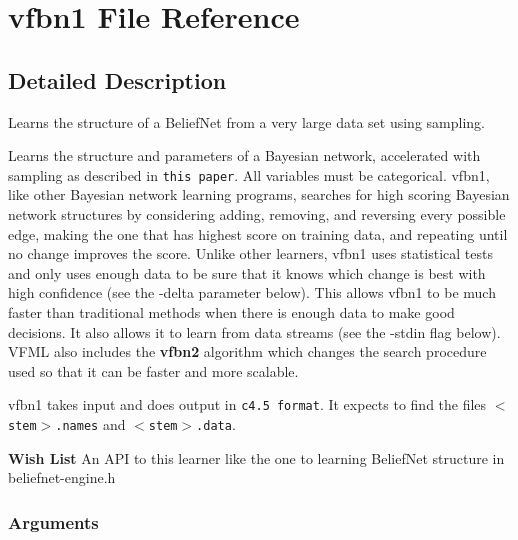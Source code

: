 \section{vfbn1 File Reference}
\label{vfbn1}


\subsection{Detailed Description}
Learns the structure of a Belief\-Net from a very large data set using sampling. 

Learns the structure and parameters of a Bayesian network, accelerated with sampling as described in {\tt this paper}. All variables must be categorical. vfbn1, like other Bayesian network learning programs, searches for high scoring Bayesian network structures by considering adding, removing, and reversing every possible edge, making the one that has highest score on training data, and repeating until no change improves the score. Unlike other learners, vfbn1 uses statistical tests and only uses enough data to be sure that it knows which change is best with high confidence (see the -delta parameter below). This allows vfbn1 to be much faster than traditional methods when there is enough data to make good decisions. It also allows it to learn from data streams (see the -stdin flag below). VFML also includes the {\bf vfbn2} algorithm which changes the search procedure used so that it can be faster and more scalable.

vfbn1 takes input and does output in {\tt c4.5 format}. It expects to find the files {\tt $<$stem$>$.names} and {\tt $<$stem$>$.data}.

\begin{Desc}
\item[{\bf Wish List}]An API to this learner like the one to learning Belief\-Net structure in beliefnet-engine.h \end{Desc}
\subsubsection*{Arguments}

